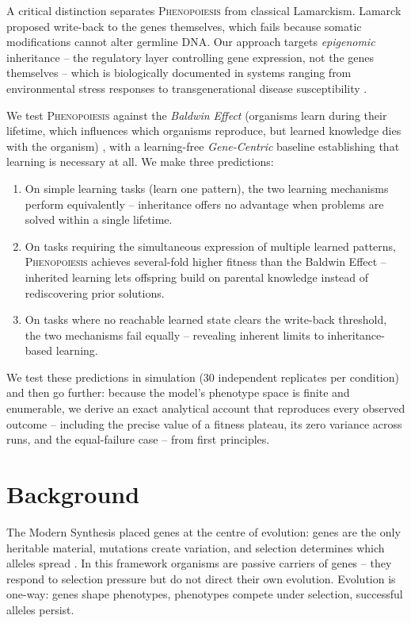 \documentclass[11pt]{article}
\newcommand{\Pheno}{\textsc{Phenopoiesis}}
\begin{document}
A critical distinction separates \Pheno{} from classical Lamarckism. Lamarck
proposed write-back to the genes themselves, which fails because somatic
modifications cannot alter germline DNA. Our approach targets \emph{epigenomic}
inheritance -- the regulatory layer controlling gene expression, not the genes
themselves -- which is biologically documented in systems ranging from
environmental stress responses to transgenerational disease susceptibility
\citep{Pembrey2006,Rakyan2002}.

We test \Pheno{} against the \emph{Baldwin Effect} (organisms learn during
their lifetime, which influences which organisms reproduce, but learned
knowledge dies with the organism) \citep{Baldwin1896}, with a learning-free
\emph{Gene-Centric} baseline establishing that learning is necessary at all.
We make three predictions:

\begin{enumerate}
  \item On simple learning tasks (learn one pattern), the two learning
        mechanisms perform equivalently -- inheritance offers no advantage when
        problems are solved within a single lifetime.
  \item On tasks requiring the simultaneous expression of multiple learned
        patterns, \Pheno{} achieves several-fold higher fitness than the
        Baldwin Effect -- inherited learning lets offspring build on parental
        knowledge instead of rediscovering prior solutions.
  \item On tasks where no reachable learned state clears the write-back
        threshold, the two mechanisms fail equally -- revealing inherent limits
        to inheritance-based learning.
\end{enumerate}

We test these predictions in simulation (30 independent replicates per
condition) and then go further: because the model's phenotype space is finite
and enumerable, we derive an exact analytical account that reproduces every
observed outcome -- including the precise value of a fitness plateau, its zero
variance across runs, and the equal-failure case -- from first principles.

\section{Background}

The Modern Synthesis placed genes at the centre of evolution: genes are the only
heritable material, mutations create variation, and selection determines which
alleles spread \citep{Darwin1859,Huxley1942}. In this framework organisms are
passive carriers of genes -- they respond to selection pressure but do not direct
their own evolution. Evolution is one-way: genes shape phenotypes, phenotypes
compete under selection, successful alleles persist.
\end{document}
